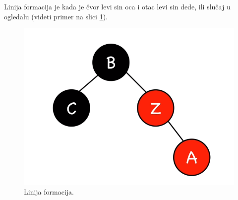 \documentclass[a4paper]{article}
\begin{document}
    Linija formacija je kada je čvor levi sin oca i otac levi sin dede, ili slučaj u ogledalu
    (videti primer na slici \ref{fig:line}).
    \begin{figure}[h!]
        \begin{center}
        \includegraphics[scale=0.3]{line.png}
        \end{center}
        \caption{Linija formacija.}
        \label{fig:line}
    \end{figure}
\end{document}
